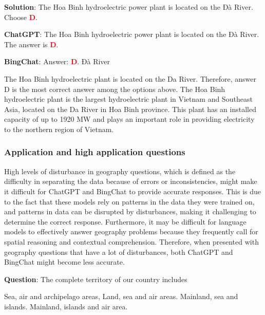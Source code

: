 \documentclass{article}
\begin{document}
{\begin{mdframed}[linewidth=1pt,linecolor=red]
		\textbf{Solution}: The Hoa Binh hydroelectric power plant is located on the Đà River. Choose \textcolor{red}{\textbf{D}}.
		
		\textbf{ChatGPT}: The Hoa Binh hydroelectric power plant is located on the Đà River. The answer is \textcolor{red}{\textbf{D}}.


		\textbf{BingChat}: Answer: \textcolor{red}{\textbf{D}}. Đà River
		
		The Hoa Binh hydroelectric plant is located on the Da River. Therefore, answer D is the most correct answer among the options above. The Hoa Binh hydroelectric plant is the largest hydroelectric plant in Vietnam and Southeast Asia, located on the Da River in Hoa Binh province. This plant has an installed capacity of up to 1920 MW and plays an important role in providing electricity to the northern region of Vietnam.
		
		
	\end{mdframed}
	
	\subsubsection{Application and high application questions}
	
	\label{VNHSGE_Geo_Complex}
	
	High levels of disturbance in geography questions, which is defined as the difficulty in separating the data because of errors or inconsistencies, might make it difficult for ChatGPT and BingChat to provide accurate responses. This is due to the fact that these models rely on patterns in the data they were trained on, and patterns in data can be disrupted by disturbances, making it challenging to determine the correct response. Furthermore, it may be difficult for language models to effectively answer geography problems because they frequently call for spatial reasoning and contextual comprehension. Therefore, when presented with geography questions that have a lot of disturbances, both ChatGPT and BingChat might become less accurate.
	
	
	\begin{mdframed}[linewidth=1pt,linecolor=red] \textbf{Question}: The complete territory of our country includes
		
		
		
		\begin{choices}
			\choice Sea, air and archipelago areas,
			\choice Land, sea and air areas.
			\choice Mainland, sea and islands.
			\choice Mainland, islands and air area.
		\end{choices}
		

\end{mdframed}}
\end{document}
